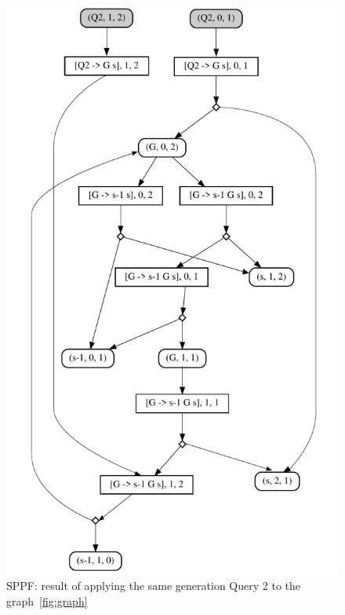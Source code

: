 \begin{figure}[h]
\includegraphics[scale=0.5]{sppf}
\caption{SPPF: result of applying the same generation Query 2 to the graph~\ref{fig:graph}}
\label{fig:sppf}
\end{figure}

